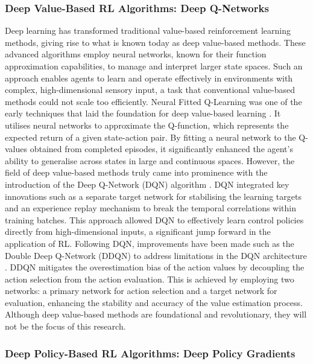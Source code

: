 \subsubsection{Deep Value-Based RL Algorithms: Deep Q-Networks}

Deep learning has transformed traditional value-based reinforcement learning methods, giving rise to what is known today as deep value-based methods. These advanced algorithms employ neural networks, known for their function approximation capabilities, to manage and interpret larger state spaces. Such an approach enables agents to learn and operate effectively in environments with complex, high-dimensional sensory input, a task that conventional value-based methods could not scale too efficiently. Neural Fitted Q-Learning was one of the early techniques that laid the foundation for deep value-based learning \cite{mnih_playing_2013}. It utilises neural networks to approximate the Q-function, which represents the expected return of a given state-action pair. By fitting a neural network to the Q-values obtained from completed episodes, it significantly enhanced the agent's ability to generalise across states in large and continuous spaces. However, the field of deep value-based methods truly came into prominence with the introduction of the Deep Q-Network (DQN) algorithm \cite{mnih_human-level_2015}. DQN integrated key innovations such as a separate target network for stabilising the learning targets and an experience replay mechanism to break the temporal correlations within training batches. This approach allowed DQN to effectively learn control policies directly from high-dimensional inputs, a significant jump forward in the application of RL. Following DQN, improvements have been made such as the Double Deep Q-Network (DDQN) to address limitations in the DQN architecture \cite{van_hasselt_deep_2016}. DDQN mitigates the overestimation bias of the action values by decoupling the action selection from the action evaluation. This is achieved by employing two networks: a primary network for action selection and a target network for evaluation, enhancing the stability and accuracy of the value estimation process. Although deep value-based methods are foundational and revolutionary, they will not be the focus of this research.

\subsubsection{Deep Policy-Based RL Algorithms: Deep Policy Gradients}


